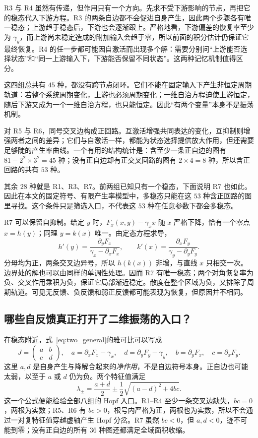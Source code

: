 \documentclass[11pt,a4paper,UTF8,fontset=fandol]{ctexart}
\begin{document}
R3 与 R4 虽然有传递，但作用只有一个方向。先求不受下游影响的节点，再把它的稳态代入下游方程。R3 的两条自边都不会促进自身产生，因此两个步骤各有唯一稳态；上游趋于稳态后，下游也会逐渐跟上。严格地看，下游偏差的恢复率至少为 $\gamma_y$，而上游尚未稳定造成的附加输入会趋于零，所以前面的积分估计仍保证它最终恢复。R4 的任一步都可能因自激活而出现多个解：需要分别问“上游能否选择状态”和“同一上游输入下，下游能否保留不同状态”。这两种记忆机制值得区分。

这四组总共有 $45$ 种，都没有跨节点闭环。它们不能在固定输入下产生非恒定周期轨道：若整个系统周期变化，上游也必须周期变化；一维自治方程迫使上游恒定，随后下游又成为一个一维自治方程，也只能恒定。因此“有两个变量”本身不是振荡机制。

对 R5 与 R6，同号交叉边构成正回路。互激活增强共同表达的变化，互抑制则增强两者之间的差异；它们与自激活一样，都能为状态选择提供放大作用，但还需要足够陡的产生率曲线。一个有用的结构统计是：含至少一条正自边的图有 $81-2^2\times3^2=45$ 种；没有正自边却有正交叉回路的图有 $2\times4=8$ 种，所以含正回路的共有 $53$ 种。

其余 $28$ 种就是 R1、R3、R7。前两组已知只有一个稳态，下面说明 R7 也如此。因此在本文的固定符号、有限产生率模型中，多稳态只能在这 $53$ 种含正回路的图里寻找。这个条件只是筛选入口，不代表这 $53$ 种在任意参数下都会多稳态。

R7 可以保留自抑制。给定 $y$ 时，$F_x(x,y)-\gamma_xx$ 随 $x$ 严格下降，恰有一个零点 $x=h(y)$；同理 $y=k(x)$ 唯一。由定态方程求导，
\[
h'(y)=\frac{\partial_yF_x}{\gamma_x-\partial_xF_x},\qquad
k'(x)=\frac{\partial_xF_y}{\gamma_y-\partial_yF_y}.
\]
分母均为正，两条交叉边异号，所以 $h(k(x))$ 非增，与直线 $x$ 只相交一次。边界处的解也可以由同样的单调性处理。因而 R7 有唯一稳态；两个对角恢复率为负、交叉作用乘积为负，保证它局部渐近稳定。散度在整个区域为负，又排除了周期轨道。可见无反馈、负反馈和弱正反馈都可能表现为恢复，但原因并不相同。

\subsection{哪些自反馈真正打开了二维振荡的入口？}
在稳态附近，式~\eqref{eq:two_general}的雅可比可以写成
\[
J=\begin{pmatrix}a&b\\c&d\end{pmatrix},\quad
 a=\partial_xF_x-\gamma_x,\quad d=\partial_yF_y-\gamma_y,
\quad b=\partial_yF_x,\quad c=\partial_xF_y.
\]
这里 $a,d$ 是自身产生与降解合起来的\emph{净作用}，不是自边符号本身。正自边也可能太弱，以至于 $a$ 或 $d$ 仍为负。两个特征值满足
\[
\lambda_{\pm}=\frac{a+d}{2}\pm\frac12\sqrt{(a-d)^2+4bc}.
\]
这一个公式便能检验全部八组的 Hopf 入口。R1--R4 至少一条交叉边缺失，$bc=0$，两根为实数；R5、R6 有 $bc>0$，根号内严格为正，两根也为实数，所以不会通过一对复特征值穿越虚轴产生 Hopf 分岔。R7 虽然 $bc<0$，但 $a,d<0$，迹不可能到零；没有正自边的所有 $36$ 种图还都满足全域面积收缩。
\end{document}
